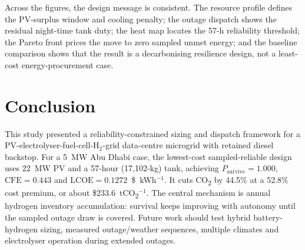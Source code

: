 \documentclass[conference]{IEEEtran}
\begin{document}
Across the figures, the design message is consistent. The resource profile defines the PV-surplus window and cooling penalty; the outage dispatch shows the residual night-time tank duty; the heat map locates the 57-h reliability threshold; the Pareto front prices the move to zero sampled unmet energy; and the baseline comparison shows that the result is a decarbonising resilience design, not a least-cost energy-procurement case.

\section{Conclusion}

This study presented a reliability-constrained sizing and dispatch framework for a PV-electrolyser-fuel-cell-H$_2$-grid data-centre microgrid with retained diesel backstop. For a 5~MW Abu Dhabi case, the lowest-cost sampled-reliable design uses 22~MW PV and a 57-hour (17{,}102-kg) tank, achieving $P_{\mathrm{survive}}=1.000$, $\mathrm{CFE}=0.443$ and $\mathrm{LCOE}=0.1272$~\$~kWh$^{-1}$. It cuts CO\textsubscript{2} by 44.5\% at a 52.8\% cost premium, or about \$233.6~tCO\textsubscript{2}$^{-1}$. The central mechanism is annual hydrogen inventory accumulation: survival keeps improving with autonomy until the sampled outage draw is covered. Future work should test hybrid battery-hydrogen sizing, measured outage/weather sequences, multiple climates and electrolyser operation during extended outages.



\end{document}
